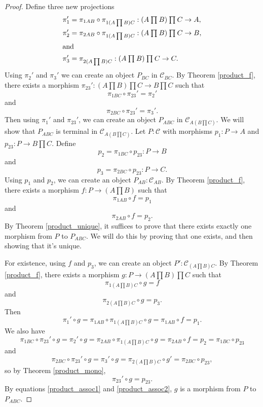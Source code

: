 \documentclass[../math.tex]{subfiles}
\begin{document}
\begin{proof}
    Define three new projections
    \begin{align*}
        \pi_1' &= \pi_{1AB} \circ \pi_{1(A \prod B) C}
            : (A \mathbin{\textstyle{\prod}} B) \mathbin{\textstyle{\prod}} C \to A, \\
        \pi_2' &= \pi_{2AB} \circ \pi_{1(A \prod B) C}
            : (A \mathbin{\textstyle{\prod}} B) \mathbin{\textstyle{\prod}} C \to B, \\
    \intertext{and}
        \pi_3' &= \pi_{2(A \prod B) C}
            : (A \mathbin{\textstyle{\prod}} B) \mathbin{\textstyle{\prod}} C \to C.
    \end{align*}
    Using $\pi_2'$ and $\pi_3'$ we can create an object $P_{BC}$ in $\mathcal
    C_{BC}$.  By Theorem \ref{product_f}, there exists a morphism $\pi_{23}' :
    (A \prod B) \prod C \to B \prod C$ such that
    \[
        \pi_{1BC} \circ \pi_{23}' = \pi_2'
    \]
    and
    \[
        \pi_{2BC} \circ \pi_{23}' = \pi_3'.
    \]
    Then using $\pi_1'$ and $\pi_{23}'$, we can create an object $P_{ABC}$ in
    $\mathcal C_{A(B \prod C)}$.  We will show that $P_{ABC}$ is terminal in
    $\mathcal C_{A(B \prod C)}$.  Let $P : \mathcal C$ with morphisms $p_1 : P
    \to A$ and $p_{23} : P \to B \prod C$.  Define
    \[
        p_2 = \pi_{1BC} \circ p_{23} : P \to B
    \]
    and
    \[
        p_3 = \pi_{2BC} \circ p_{23} : P \to C.
    \]
    Using $p_1$ and $p_2$, we can create an object $P_{AB} : \mathcal C_{AB}$.
    By Theorem \ref{product_f}, there exists a morphism $f : P \to (A \prod B)$
    such that
    \[
        \pi_{1AB} \circ f = p_1
    \]
    and
    \[
        \pi_{2AB} \circ f = p_2.
    \]
    By Theorem \ref{product_unique}, it suffices to prove that there exists
    exactly one morphism from $P$ to $P_{ABC}$.  We will do this by proving that
    one exists, and then showing that it's unique.

    For existence, using $f$ and $p_3$, we can create an object $P' : \mathcal
    C_{(A \prod B) C}$.  By Theorem \ref{product_f}, there exists a morphism $g
    : P \to (A \prod B) \prod C$ such that
    \[
        \pi_{1 (A \prod B) C} \circ g = f
    \]
    and
    \[
        \pi_{2 (A \prod B) C} \circ g = p_3.
    \]
    Then
    \begin{equation} \label{product_assoc1}
        \pi_1' \circ g
        = \pi_{1AB} \circ \pi_{1 (A \prod B) C} \circ g
        = \pi_{1AB} \circ f = p_1.
    \end{equation}
    We also have
    \[
        \pi_{1BC} \circ \pi_{23}' \circ g
        = \pi_2' \circ g
        = \pi_{2AB} \circ \pi_{1 (A \prod B) C} \circ g
        = \pi_{2AB} \circ f
        = p_2
        = \pi_{1BC} \circ p_{23}
    \]
    and
    \[
        \pi_{2BC} \circ \pi_{23}' \circ g
        = \pi_3' \circ g
        = \pi_{2 (A \prod B) C} \circ g'
        = \pi_{2BC} \circ p_{23},
    \]
    so by Theorem \ref{product_mono},
    \begin{equation} \label{product_assoc2}
        \pi_{23}' \circ g = p_{23}.
    \end{equation}
    By equations \ref{product_assoc1} and \ref{product_assoc2}, $g$ is a
    morphism from $P$ to $P_{ABC}$.


\end{proof}
\end{document}
